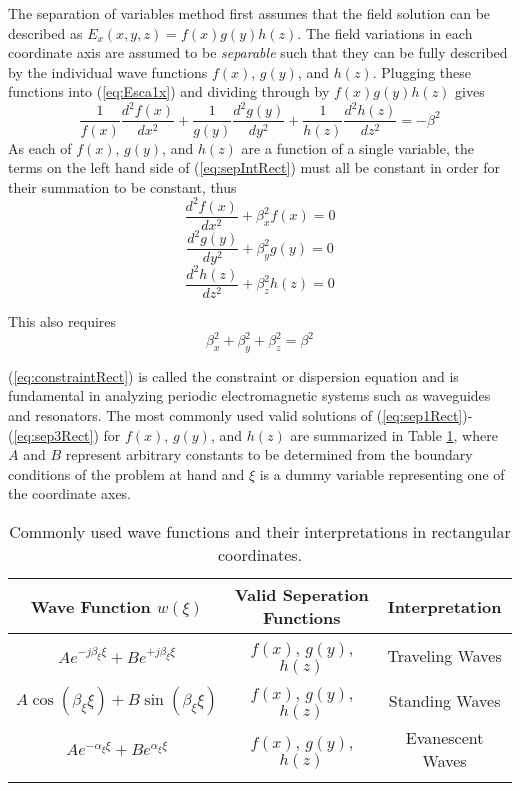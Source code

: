 The separation of variables method first assumes that the field solution can be described as $E_x(x, y, z) = f(x)g(y)h(z)$. The field variations in each coordinate axis are assumed to be \textit{separable} such that they can be fully described by the individual wave functions $f(x)$, $g(y)$, and $h(z)$. Plugging these functions into (\ref{eq:Esca1x}) and dividing through by $f(x)g(y)h(z)$ gives  
\begin{equation}\label{eq:sepIntRect}
	\frac{1}{f(x)} \frac{d^2f(x)}{dx^2} + \frac{1}{g(y)} \frac{d^2g(y)}{dy^2} + \frac{1}{h(z)} \frac{d^2h(z)}{dz^2} = -\beta^2
\end{equation}
As each of $f(x)$, $g(y)$, and $h(z)$ are a function of a single variable, the terms on the left hand side of (\ref{eq:sepIntRect}) must all be constant in order for their summation to be constant, thus
\begin{equation}\label{eq:sep1Rect}
	\frac{d^2f(x)}{dx^2} + \beta_x^2f(x) = 0
\end{equation}
\begin{equation}\label{eq:sep2Rect}
	\frac{d^2g(y)}{dy^2} + \beta_y^2g(y) = 0
\end{equation}
\begin{equation}\label{eq:sep3Rect}
	\frac{d^2h(z)}{dz^2} + \beta_z^2h(z) = 0
\end{equation}

This also requires
\begin{equation}\label{eq:constraintRect}
	\beta_x^2 + \beta_y^2 + \beta_z^2 = 	\beta^2
\end{equation}

(\ref{eq:constraintRect}) is called the constraint or dispersion equation and is fundamental in analyzing periodic electromagnetic systems such as waveguides and resonators. The most commonly used valid solutions of (\ref{eq:sep1Rect})-(\ref{eq:sep3Rect}) for $f(x)$, $g(y)$, and $h(z)$ are summarized in Table \ref{tab:rectWaves}, where $A$ and $B$ represent arbitrary constants to be determined from the boundary conditions of the problem at hand and $\xi$ is a dummy variable representing one of the coordinate axes.

\begin{table}[h]
	\renewcommand*{\arraystretch}{1.4}
	\centering
	\caption{Commonly used wave functions and their interpretations in rectangular coordinates.}
	\label{tab:rectWaves}
		\begin{tabular}{c c c}
			\toprule
			\addlinespace[2pt] %
			\toprule
			Wave Function $w(\xi)$ & Valid Seperation Functions & Interpretation \\
			\toprule 
			\addlinespace[5pt]
			$Ae^{-j\beta_{\xi}\xi} + Be^{+j\beta_{\xi}\xi}$ & $f(x)$, $g(y)$, $h(z)$ & Traveling Waves \\
			$A\cos(\beta_{\xi}\xi) + B\sin(\beta_{\xi}\xi)$ & $f(x)$, $g(y)$, $h(z)$ & Standing Waves \\
			$Ae^{-\alpha_{\xi}\xi} + Be^{\alpha_{\xi}\xi}$ & $f(x)$, $g(y)$, $h(z)$ & Evanescent Waves \\			
			\bottomrule
			\addlinespace[1pt] %
			\bottomrule
		\end{tabular}
\end{table}

